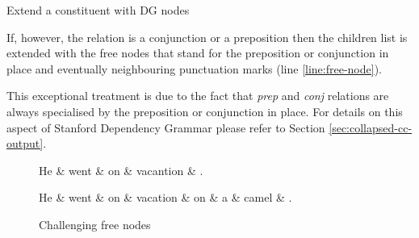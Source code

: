 \begin{algorithm}[H]
\Input { \cgPointer, \Children, \elementType, \edge, \dg, \cg}
	\caption{Extend a constituent with DG nodes}
	\label{alg:extend-current}
\end{algorithm}

If, however, the \edge relation is a conjunction or a preposition then the children list is extended with the free nodes that stand for the preposition or conjunction in place and eventually neighbouring punctuation marks (line \ref{line:free-node}). 

This exceptional treatment is due to the fact that \textit{prep} and \textit{conj} relations are always specialised by the preposition or conjunction in place. For details on this aspect of Stanford Dependency Grammar please refer to Section \ref{sec:collapsed-cc-output}.

\begin{figure}
\centering
\begin{minipage}[b]{0.45\textwidth}
\centering
	\begin{dependency}
		\begin{deptext}[]
	He \& went \& on \& vacantion \& . \\
		\end{deptext}
	\end{dependency}
\end{minipage}
\begin{minipage}[b]{0.45\textwidth}
	\begin{dependency}
		\begin{deptext}[]
	He \& went \& on \& vacation \& on \& a \& camel \& . \\
		\end{deptext}
	\end{dependency}
\end{minipage}
\caption{Challenging free nodes}
\label{fig:challenging-free-nodes}
\end{figure}

